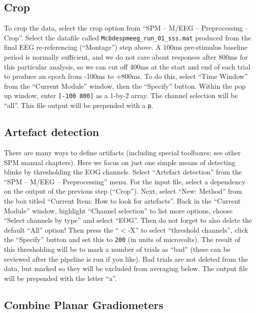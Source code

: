 \subsection{Crop}

To crop the data, select the crop option from ``SPM -- M/EEG -- Preprocessing -- Crop''. Select the datafile called \texttt{Mcbdespmeeg\_run\_01\_sss.mat} produced from the final EEG re-referencing (``Montage'') step above.  A 100ms pre-stimulus baseline period is normally sufficient, and we do not care about responses after 800ms for this particular analysis, so we can cut off 400ms at the start and end of each trial to produce an epoch from -100ms to +800ms. To do this, select ``Time Window'' from the ``Current Module'' window, then the ``Specify'' button. Within the pop up window, enter \texttt{[-100 800]} as a 1-by-2 array. The channel selection will be ``all''. This file output will be prepended with a \texttt{p}.

\subsection{Artefact detection}

There are many ways to define artifacts (including special toolboxes; see other SPM manual chapters). Here we focus on just one simple means of detecting blinks by thresholding the EOG channels. Select ``Artefact detection'' from the ``SPM -- M/EEG -- Preprocessing'' menu. For the input file, select a dependency on the output of the previous step (``Crop''). Next, select ``New: Method'' from the box titled ``Current Item: How to look for artefacts''. Back in the ``Current Module'' window, highlight ``Channel selection'' to list more options, choose ``Select channels by type'' and select ``EOG''. Then do not forget to also delete the default ``All'' option! Then press the ``\(<\)-X'' to select ``threshold channels'', click the ``Specify'' button and set this to \texttt{200} (in units of microvolts). The result of this thresholding will be to mark a number of trials as ``bad'' (these can be reviewed after the pipeline is run if you like). Bad trials are not deleted from the data, but marked so they will be excluded from averaging below. The output file will be prepended with the letter ``a''. 

\subsection{Combine Planar Gradiometers}

